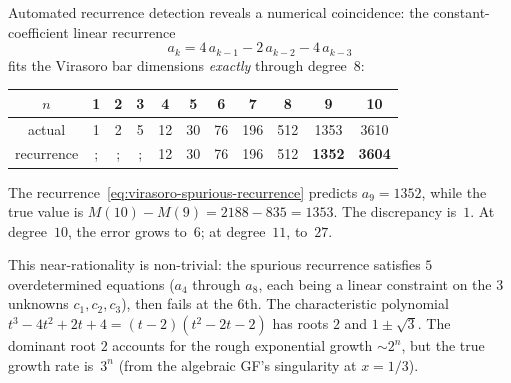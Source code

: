 \begin{remark}
\label{rem:virasoro-spurious-recurrence}
Automated recurrence detection reveals a numerical
coincidence: the constant-coefficient linear recurrence
\begin{equation}\label{eq:virasoro-spurious-recurrence}
a_k = 4\,a_{k-1} - 2\,a_{k-2} - 4\,a_{k-3}
\end{equation}
fits the Virasoro bar dimensions \emph{exactly} through degree~$8$:

\begin{center}
\renewcommand{\arraystretch}{1.2}
\begin{tabular}{c|cccccccccc}
$n$ & 1 & 2 & 3 & 4 & 5 & 6 & 7 & 8 & 9 & 10 \\
\hline
actual & 1 & 2 & 5 & 12 & 30 & 76 & 196 & 512 & 1353 & 3610 \\
recurrence &; &; &; & 12 & 30 & 76 & 196 & 512 & \textbf{1352} & \textbf{3604}
\end{tabular}
\end{center}

The recurrence~\eqref{eq:virasoro-spurious-recurrence} predicts $a_9 = 1352$,
while the true value is $M(10) - M(9) = 2188 - 835 = 1353$. The discrepancy
is~$1$. At degree~$10$, the error grows to~$6$; at degree~$11$, to~$27$.

This near-rationality is non-trivial: the spurious recurrence satisfies
$5$ overdetermined equations ($a_4$ through $a_8$, each being a
linear constraint on the $3$ unknowns $c_1, c_2, c_3$), then
fails at the $6$th. The characteristic polynomial
$t^3 - 4t^2 + 2t + 4 = (t-2)(t^2 - 2t - 2)$ has roots
$2$ and $1 \pm \sqrt{3}$. The dominant root $2$ accounts for the
rough exponential growth $\sim 2^n$, but the true growth rate is~$3^n$
(from the algebraic GF's singularity at $x = 1/3$).
\end{remark}

